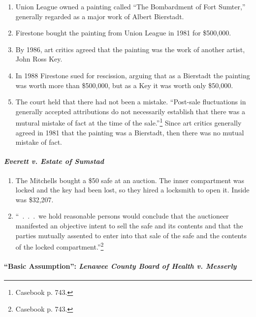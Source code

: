 \begin{enumerate}
    \item Union League owned a painting called ``The Bombardment of Fort 
    Sumter,'' generally regarded as a major work of Albert Bierstadt.
    \item Firestone bought the painting from Union League in 1981 for 
    \$500,000.
    \item By 1986, art critics agreed that the painting was the work of 
    another artist, John Ross Key.
    \item In 1988 Firestone sued for rescission, arguing that as a Bierstadt 
    the painting was worth more than \$500,000, but as a Key it was worth only 
    \$50,000.
    \item The court held that there had not been a mistake. ``Post-sale 
    fluctuations in generally accepted attributions do not necessarily 
    establish that there was a mutural mistake of fact at the time of the 
    sale.''\footnote{Casebook p. 743.} Since art critics generally agreed in 
    1981 that the painting was a Bierstadt, then there was no mutual mistake 
    of fact.
\end{enumerate}

\paragraph{\emph{Everett v. Estate of Sumstad}}

\begin{enumerate}
    \item The Mitchells bought a \$50 safe at an auction. The inner 
    compartment was locked and the key had been lost, so they hired a 
    locksmith to open it. Inside was \$32,207.
    \item ``~.~.~.~we hold reasonable persons would conclude that the 
    auctioneer manifested an objective intent to sell the safe and its 
    contents and that the parties mutually assented to enter into that sale of 
    the safe and the contents of the locked compartment.''\footnote{Casebook 
    p. 743.}
\end{enumerate}

\paragraph{``Basic Assumption'': \emph{Lenawee County Board of Health v. 
Messerly}}

